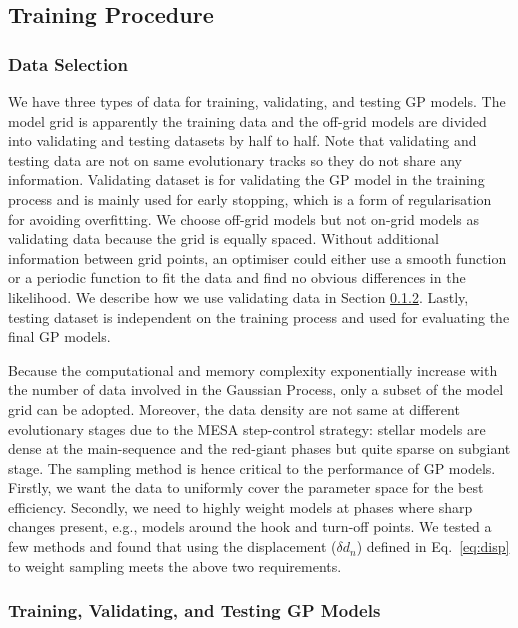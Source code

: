 \subsection{Training Procedure}\label{workflow}
  
\subsubsection{Data Selection}

We have three types of data for training, validating, and testing GP models. The model grid is apparently the training data and the off-grid models are divided into validating and testing datasets by half to half. Note that validating and testing data are not on same evolutionary tracks so they do not share any information. Validating dataset is for validating the GP model in the training process and is mainly used for early stopping, which is a form of regularisation for avoiding overfitting. We choose off-grid models but not on-grid models as validating data because the grid is equally spaced. Without additional information between grid points, an optimiser could either use a smooth function or a periodic function to fit the data and find no obvious differences in the likelihood. We describe how we use validating data in Section \ref{sec:training}. Lastly, testing dataset is independent on the training process and used for evaluating the final GP models. 

Because the computational and memory complexity exponentially increase with the number of data involved in the Gaussian Process, only a subset of the model grid can be adopted. Moreover, the data density are not same at different evolutionary stages due to the \textsc{MESA} step-control strategy: stellar models are dense at the main-sequence and the red-giant phases but quite sparse on subgiant stage. The sampling method is hence critical to the performance of GP models. Firstly, we want the data to uniformly cover the parameter space for the best efficiency. Secondly, we need to highly weight models at phases where sharp changes present, e.g., models around the hook and turn-off points.   
We tested a few methods and found that using the displacement ($\delta d_{n}$) defined in Eq.~\ref{eq:disp} to weight sampling meets the above two requirements. 

\subsubsection{Training, Validating, and Testing GP Models}\label{sec:training}

